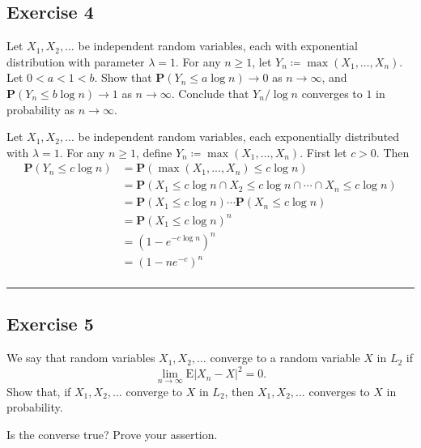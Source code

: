 \documentclass{article}
\theoremstyle{break}
\renewenvironment{proof}{{\bf Proof:}}{\hfill\rule{2mm}{2mm}}
\newcommand{\E}{\mathrm{E}}
\renewcommand{\P}{\mathbf{P}}
\begin{document}
\subsection*{Exercise 4}

Let $X_{1},X_{2},\ldots$ be independent random variables, each with exponential distribution with parameter $\lambda=1$.  For any $n \geq 1$, let $Y_{n}\coloneqq\max(X_{1},\ldots,X_{n})$.  Let $0<a<1<b$.  Show that $\P(Y_{n}\leq a\log n)\to0$ as $n\to\infty$, and $\P(Y_{n}\leq b\log n)\to1$ as $n\to\infty$.  Conclude that $Y_{n}/\log n$ converges to $1$ in probability as $n\to\infty$.

\begin{proof}
  Let $X_1, X_2, ...$ be independent random variables, each exponentially distributed with $\lambda = 1$. For any $n \geq 1$, define $Y_n \coloneqq \max(X_1, ... , X_n).$ First let $c > 0$. Then
  \begin{align*}
    \P(Y_n \leq c \log n) &= \P( \max(X_1, ... , X_n) \leq c \log n) \\
    &= \P(X_1 \leq c \log n \cap X_2 \leq c \log n \cap \cdots \cap X_n \leq c \log n) \\
    &= \P(X_1 \leq c \log n) \cdots \P(X_n \leq c \log n) \\
    &= \P(X_1 \leq c \log n)^n \\
    &= (1 - e^{-c \log n})^n \\
    &= (1 - ne^{-c})^n \\
  \end{align*}
\end{proof}




\subsection*{Exercise 5}

We say that random variables $X_{1},X_{2},\ldots$ converge to a random variable $X$ in $L_{2}$ if
\[\lim_{n\to\infty}\E|X_{n}-X|^{2}=0.\]
Show that, if $X_{1},X_{2},\ldots$ converge to $X$ in $L_{2}$, then $X_{1},X_{2},\ldots$ converges to $X$ in probability.

Is the converse true?  Prove your assertion.
\end{document}
